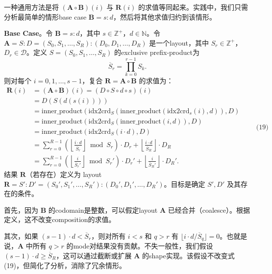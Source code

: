 \documentclass{article}
\begin{document}
一种通用方法是将 \((\mathbf{A}\circ \mathbf{B})(i)\) 与 \(\mathbf{R}(i)\) 的求值等同起来。实践中，我们只需分析最简单的情形base case \(\mathbf{B}=s:d\)，然后将其他求值归约到该情形。

\textbf{Base Case}。令 \(\mathbf{B}=s:d\)，其中 \(s\in\mathbb{Z}^+\)，\(d\in\mathbb{N}\)。令 \(\mathbf{A}=S:D=(S_0,S_1,\ldots,S_R):(D_0,D_1,\ldots,D_R)\) 是一个layout，其中 \(S_r\in\mathbb{Z}^+\)，\(D_r\in\mathcal{D}\)。定义 \(S=(S_0,S_1,\ldots,S_R)\) 的exclusive prefix-product为
\[
\overline{S}_r = \prod_{k=0}^{r-1} S_k.
\]
则对每个 \(i=0,1,\ldots,s-1\)，复合 \(\mathbf{R}=\mathbf{A}\circ \mathbf{B}\) 的求值为：
\[
\begin{aligned}
\mathbf{R}(i) &= (\mathbf{A}\circ \mathbf{B})(i) = (D\circ S\circ d\circ s)(i) \\
&= D(S(d(s(i)))) \\
&= \mathrm{inner\_product}(\mathrm{idx2crd}_S(\mathrm{inner\_product}(\mathrm{idx2crd}_s(i),d)), D) \\
&= \mathrm{inner\_product}(\mathrm{idx2crd}_S(\mathrm{inner\_product}(i,d)), D) \\
&= \mathrm{inner\_product}(\mathrm{idx2crd}_S(i\cdot d), D) \\
&= \sum_{r=0}^{R-1} \left( \left\lfloor \frac{i\cdot d}{\overline{S}_r} \right\rfloor \bmod S_r \right) \cdot D_r
      + \left\lfloor \frac{i\cdot d}{\overline{S}_R} \right\rfloor \cdot D_R \\
&= \sum_{r=0}^{R-1} \left( \left\lfloor \frac{i}{\overline{S}_r'} \right\rfloor \bmod S_r' \right) \cdot D_r'
      + \left\lfloor \frac{i}{\overline{S}_R'} \right\rfloor \cdot D_R'.
\end{aligned}
\qquad \text{(19)}
\]
结果 \(\mathbf{R}\)（若存在）定义为 layout \(\mathbf{R}=S':D'=(S_0',S_1',\ldots,S_R'):(D_0',D_1',\ldots,D_R')\)。目标是确定 \(S',D'\) 及其存在的条件。

首先，因为 \(\mathbf{B}\) 的codomain是整数，可以假定layout \(\mathbf{A}\) 已经合并（coalesce）。根据定义，这不改变composition的求值。

其次，如果 \((s-1)\cdot d < \overline{S}_r\)，则对所有 \(i<s\) 和 \(q>r\) 有 \(\lfloor i\cdot d / \overline{S}_q\rfloor = 0\)。也就是说，\(\mathbf{A}\) 中所有 \(q>r\) 的mode对结果没有贡献。不失一般性，我们假设 \((s-1)\cdot d \ge \overline{S}_R\)，这可以通过截断或扩展 \(\mathbf{A}\) 的shape实现。该假设不改变式 (19)，但简化了分析，消除了冗余情形。
\end{document}
